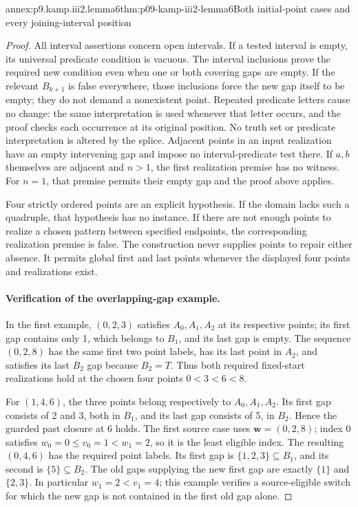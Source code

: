 \begin{annexitem}{annex:p9.kamp.iii2.lemma6}{thm:p09-kamp-iii2-lemma6}{Both initial-point cases and every joining-interval position}
\begin{proof}
All interval assertions concern open intervals. If a tested interval
is empty, its universal predicate condition is vacuous. The interval
inclusions prove the required new condition even when one or both
covering gaps are empty. If the relevant \(B_{k+1}\) is false
everywhere, those inclusions force the new gap itself to be empty;
they do not demand a nonexistent point. Repeated predicate letters
cause no change: the same interpretation is used whenever that letter
occurs, and the proof checks each occurrence at its original position.
No truth set or predicate interpretation is altered by the splice.
Adjacent points in an input realization have an empty intervening
gap and impose no interval-predicate test there. If \(a,b\) themselves
are adjacent and \(n>1\), the first realization premise has no witness.
For \(n=1\), that premise permits their empty gap and the proof above applies.

Four strictly ordered points are an explicit hypothesis. If the
domain lacks such a quadruple, that hypothesis has no instance.
If there are not enough points to realize a chosen pattern between
specified endpoints, the corresponding realization premise is false.
The construction never supplies points to repair either absence.
It permits global first and last points whenever the displayed four
points and realizations exist.

\paragraph{Verification of the overlapping-gap example.}
In the first example, \((0,2,3)\) satisfies \(A_0,A_1,A_2\)
at its respective points; its first gap contains only 1, which
belongs to \(B_1\), and its last gap is empty.
The sequence \((0,2,8)\) has the same first two point labels,
has its last point in \(A_2\), and satisfies its last \(B_2\)
gap because \(B_2=T\). Thus both required fixed-start realizations
hold at the chosen four points \(0<3<6<8\).

For \((1,4,6)\), the three points belong respectively to
\(A_0,A_1,A_2\). Its first gap consists of 2 and 3, both in
\(B_1\), and its last gap consists of 5, in \(B_2\).
Hence the guarded past closure at 6 holds. The first source case
uses \(\mathbf w=(0,2,8)\); index 0 satisfies
\(w_0=0\leq v_0=1<w_1=2\), so it is the least eligible index.
The resulting \((0,4,6)\) has the required point labels.
Its first gap is \(\{1,2,3\}\subseteq B_1\), and its second
is \(\{5\}\subseteq B_2\). The old gaps supplying the new
first gap are exactly \(\{1\}\) and \(\{2,3\}\).
In particular \(w_1=2<v_1=4\); this example verifies a
source-eligible switch for which the new gap is not contained in
the first old gap alone.


\end{proof}
\end{annexitem}
